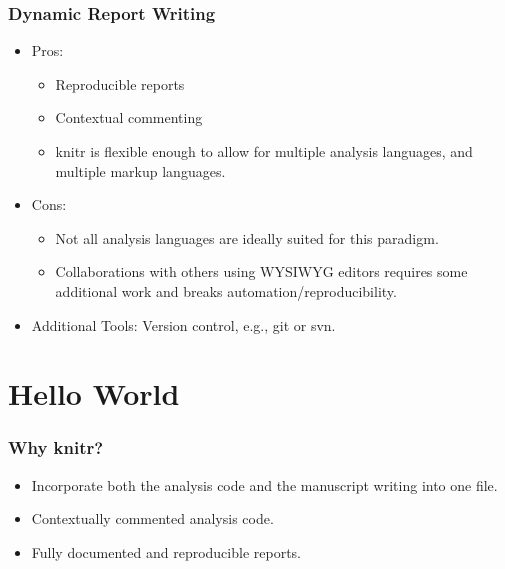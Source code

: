 \documentclass[t]{beamer}\usepackage[]{graphicx}\usepackage[]{color}
\begin{document}
\begin{frame} 
  \frametitle{Dynamic Report Writing}
  \begin{itemize}
    \item Pros: 
      \begin{itemize}
        \item Reproducible reports 
        \item Contextual commenting 
        \item knitr is flexible enough to allow for multiple analysis languages,
          and multiple markup languages.
      \end{itemize}
    \item Cons:
      \begin{itemize}
        \item Not all analysis languages are ideally suited for this paradigm.
        \item Collaborations with others using WYSIWYG editors requires some
          additional work and breaks automation/reproducibility.
      \end{itemize}
    \item Additional Tools: Version control, e.g., git or svn.
  \end{itemize}
\end{frame}


\section{Hello World}
\begin{frame}
  \frametitle{Why knitr?}
  \begin{itemize}
    \item Incorporate both the analysis code and the manuscript writing into one
      file.
    \item Contextually commented analysis code.
    \item Fully documented and reproducible reports.
  \end{itemize}
\end{frame}
\end{document}
